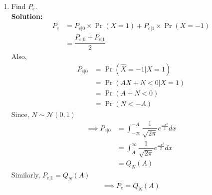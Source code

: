 \documentclass[journal,12pt,twocolumn]{IEEEtran}
\numberwithin{equation}{section}
\renewcommand\thesection{\arabic{section}}
\providecommand{\pr}[1]{\ensuremath{\Pr\left(#1\right)}}
\providecommand{\gauss}[2]{\mathcal{N}\ensuremath{\left(#1,#2\right)}}
\providecommand{\gitlink}[2]{{\color{blue}\href{https://github.com/SterbenVD/AI1110-Assignments/blob/main/Assignment\%20-\%20Random\%20Numbers/#1}{#2}}}
\newcommand{\solution}{\noindent \textbf{Solution: }}
\begin{document}
\begin{enumerate}[label=\thesection.\arabic*
        ,ref=\thesection.\theenumi]
          \begin{equation}
              P_{e|0} = \pr{\hat{X} = -1|X=1}
          \end{equation}
          and
          \begin{equation}
              P_{e|1} = \pr{\hat{X} = 1|X=-1}
          \end{equation} \\
          \solution Download the following files and execute the \gitlink{codes/5-4.c}{C program} or type in terminal:
          \begin{lstlisting}
wget https://github.com/SterbenVD/AI1110-Assignments/blob/main/Assignment\%20-\%20Random\%20Numbers/codes/5-4.c
              \end{lstlisting}
          Values Obtained:
          \begin{align}
               & \fbox{$P_{e|0} = 0.310412$}
               & \fbox{$P_{e|1} = 0.310724$}
          \end{align}
    \item Find $P_e$. \\
          \solution
          \begin{align}
              P_e & = P_{e|0} \times \pr{X = 1} + P_{e|1} \times \pr{X = -1}
              \\
                  & = \dfrac{P_{e|0} + P_{e|1}}{2}
          \end{align}
          Also,
          \begin{align}
              P_{e|0} & = \pr{\hat{X} = -1|X=1}
              \\
                      & = \pr{AX + N < 0|X=1}
              \\
                      & = \pr{A + N < 0}
              \\
                      & = \pr{N < -A}
          \end{align}
          Since, $N \sim \gauss{0}{1}$
          \begin{align}
              \implies P_{e|0} & = \int_{-\infty} ^{-A} \dfrac{1}{\sqrt{2\pi}} e^{\frac{-x^2}{2}} dx
              \\
                               & = \int_{A} ^{\infty} \dfrac{1}{\sqrt{2\pi}} e^{\frac{-x^2}{2}} dx
              \\
                               & = Q_N(A)
          \end{align}
          Similarly, $P_{e|1} = Q_N(A)$
          \begin{align}
              \implies P_e = Q_N(A)

\end{align}
\end{enumerate}
\end{document}
